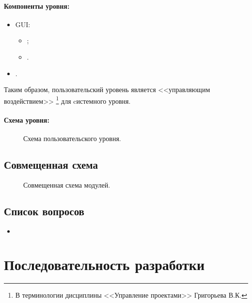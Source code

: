 \documentclass[12pt,a4paper,fullpage,titlepage]{article}
\begin{document}
\paragraph{Компоненты уровня:}
\begin{itemize}
	\item GUI:
	\begin{itemize}
		\item ;
		\item .
	\end{itemize}
	\item .\\
\end{itemize}

Таким образом, пользовательский уровень является <<управляющим воздействием>> \footnote{В терминологии дисциплины <<Управление проектами>> Григорьева В.К.} для cистемного уровня.\\

\paragraph{Схема уровня:}
\begin{figure}[thbp!]
	\centering
	
	\caption{Схема пользовательского уровня.}
\end{figure}

\newpage
\subsection{Совмещенная схема}
\begin{figure}[thbp!]
	\centering
	
	\caption{Совмещенная схема модулей.}
\end{figure}

\newpage
\subsection{Список вопросов}
\begin{itemize}
	\item
\end{itemize}

\newpage
\section{Последовательность разработки}
\end{document}
